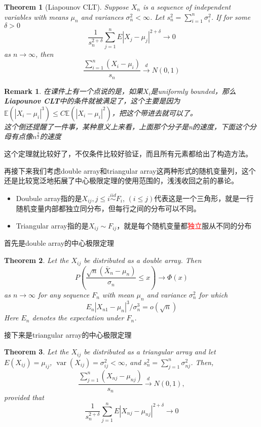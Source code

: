 \documentclass{article}
\newtheorem{theorem}{Theorem}[section]
\newtheorem{remark}{Remark}[theorem]
\begin{document}
\begin{theorem}[Liapounov CLT]
	Suppose $X_n$ is a sequence of independent variables with means $\mu_n$ and variances $\sigma_n^2<\infty$. Let $s_n^2=\sum_{i=1}^n \sigma_i^2$. If for some $\delta>0$
	$$
	\frac{1}{s_n^{2+\delta}} \sum_{j=1}^n E\left|X_j-\mu_j\right|^{2+\delta} \rightarrow 0
	$$
	as $n \rightarrow \infty$, then
	$$
	\frac{\sum_{i=1}^n\left(X_i-\mu_i\right)}{s_n} \stackrel{d}{\rightarrow} N(0,1)
	$$
\end{theorem}
\begin{remark}
	在课件上有一个点说的是，如果$X_i$是uniformly bounded，那么\textbf{Liapounov CLT}中的条件就被满足了，这个主要是因为$\mathbb{E}\left(\left|X_i-\mu_i\right|^3\right)\leq C \mathbb{E}\left(\left|X_i-\mu_i\right|^2\right)$，把这个带进去就可以了。\\
	这个倒还提醒了一件事，某种意义上来看，上面那个分子是n的速度，下面这个分母有点像$n^{\frac{3}{2}}$的速度
\end{remark}
这个定理就比较好了，不仅条件比较好验证，而且所有元素都给出了构造方法。
\par 再接下来我们考虑double array和triangular array这两种形式的随机变量列，这个还是比较宽泛地拓展了中心极限定理的使用范围的，浅浅收回之前的暴论。
\begin{itemize}
	\item Doubule array指的是$X_{ij},j\leq i\stackrel{iid}{\sim}  F_i$, $(i\leq j)$代表这是一个三角形，就是一行随机变量内部都独立同分布，但每行之间的分布可以不同。
	\item Triangular array指的是$X_{ij}\sim F_{ij}$，就是每个随机变量都\textcolor{red}{独立}服从不同的分布
\end{itemize}
首先是double array的中心极限定理
\begin{theorem}
	Let the $X_{i j}$ be distributed as a double array. Then
	$$
	P\left(\frac{\sqrt{n}\left(\bar{X}_n-\mu_n\right)}{\sigma_n} \leq x\right) \rightarrow \Phi(x)
	$$
	as $n \rightarrow \infty$ for any sequence $F_n$ with mean $\mu_n$ and variance $\sigma_n^2$ for which
	$$
	E_n\left|X_{n 1}-\mu_n\right|^3 / \sigma_n^3=o(\sqrt{n})
	$$
	Here $E_n$ denotes the expectation under $F_n$.
\end{theorem}
接下来是triangular array的中心极限定理
\begin{theorem}
	Let the $X_{i j}$ be distributed as a triangular array and let $E\left(X_{i j}\right)=\mu_{i j}$, $\operatorname{var}\left(X_{i j}\right)=\sigma_{i j}^2<\infty$, and $s_n^2=\sum_{j=1}^n \sigma_{n j}^2$. Then,
	$$
	\frac{\sum_{j=1}^n\left(X_{n j}-\mu_{n j}\right)}{s_n} \stackrel{d}{\rightarrow} N(0,1),
	$$
	provided that
	$$
	\frac{1}{s_n^{2+\delta}} \sum_{j=1}^n E\left|X_{n j}-\mu_{n j}\right|^{2+\delta} \rightarrow 0
	$$
\end{theorem}
\end{document}
